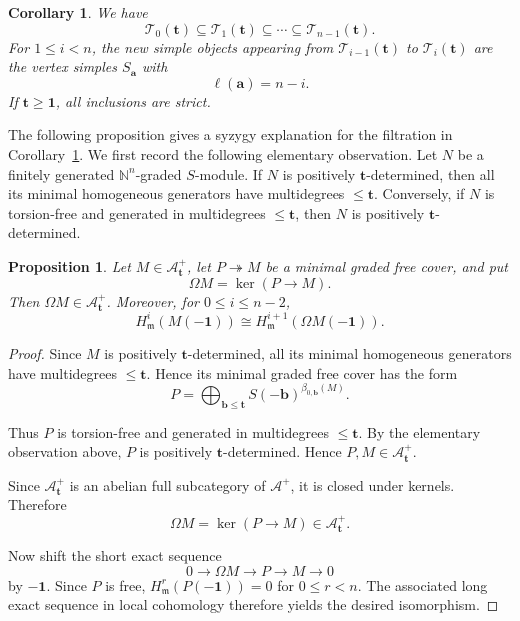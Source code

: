 \documentclass[10pt,a4paper]{amsart}
\newtheorem{proposition}[theorem]{Proposition}
\newtheorem{corollary}[theorem]{Corollary}
\begin{document}
\begin{corollary}\label{cor:finite-filtration}
We have
\[
\mathcal T_0(\mathbf t)
\subseteq\mathcal T_1(\mathbf t)
\subseteq\cdots\subseteq\mathcal T_{n-1}(\mathbf t).
\]
For $1\le i<n$, the new simple objects appearing from
$\mathcal T_{i-1}(\mathbf t)$ to $\mathcal T_i(\mathbf t)$ are the vertex
simples $S_{\mathbf a}$ with
\[
\ell(\mathbf a)=n-i.
\]
If $\mathbf t\ge\mathbf1$, all inclusions are strict.
\end{corollary}

The following proposition gives a syzygy explanation for the filtration in Corollary~\ref{cor:finite-filtration}. We first record the following elementary observation. Let $N$ be a finitely generated $\mathbb N^n$-graded $S$-module. If $N$ is positively $\mathbf t$-determined, then all its minimal homogeneous generators have multidegrees $\le \mathbf t$. Conversely, if $N$ is torsion-free and generated in multidegrees $\le \mathbf t$, then $N$ is positively $\mathbf t$-determined.

\begin{proposition}\label{prop:syzygy-filtration}
Let $M\in\mathcal A^+_{\mathbf t}$, let $P\twoheadrightarrow M$ be a minimal graded free cover, and put
$$
\Omega M=\ker(P\to M).
$$
Then $\Omega M\in\mathcal A^+_{\mathbf t}$. Moreover, for
$0\le i\le n-2$,
$$
H^i_{\mathfrak m}(M(-\mathbf1))
\cong
H^{i+1}_{\mathfrak m}(\Omega M(-\mathbf1)).
$$
\end{proposition}

\begin{proof}
Since $M$ is positively $\mathbf t$-determined, all its minimal homogeneous generators have multidegrees $\le \mathbf t$. Hence its minimal graded free cover has the form
$$
P=
\bigoplus_{\mathbf b\le \mathbf t}
S(-\mathbf b)^{\beta_{0,\mathbf b}(M)}.
$$

Thus $P$ is torsion-free and generated in multidegrees $\le \mathbf t$. By the elementary observation above, $P$ is positively $\mathbf t$-determined. Hence $P,M\in\mathcal A^+_{\mathbf t}.$


Since $\mathcal A^+_{\mathbf t}$ is an abelian full subcategory of $\mathcal A^+$, it is closed under kernels. Therefore
$$
\Omega M=\ker(P\to M)\in\mathcal A^+_{\mathbf t}.
$$

Now shift the short exact sequence
$$
0\longrightarrow\Omega M\longrightarrow P\longrightarrow M\longrightarrow0
$$
by $-\mathbf1$. Since $P$ is free, $H^r_{\mathfrak m}(P(-\mathbf1))=0$ for $0\le r<n$.
The associated long exact sequence in local cohomology therefore yields the desired isomorphism.
\end{proof}
\end{document}
